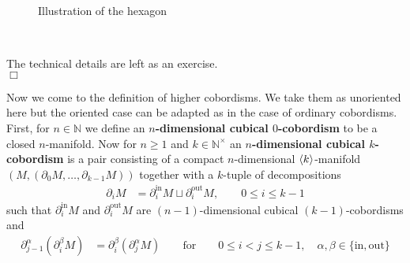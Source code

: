 \begin{exa}
\begin{enumerate}
\begin{figure}[h!]
\caption{Illustration of the hexagon}
\label{fig:hexagon}
\end{figure}
\\
\end{enumerate}
\end{exa}
\begin{prf}
The technical details are left as an exercise.
\\
\phantom{proven}
\hfill
$\Box$
\end{prf}
Now we come to the definition of higher cobordisms. We take them as unoriented here but the oriented case can be adapted as in the case of ordinary cobordisms. First, for $n \in \mathbb{N}$ we define an \textbf{$n$-dimensional cubical $0$-cobordism} to be a closed $n$-manifold. Now for $n \geq 1$ and $k \in \mathbb{N}^{\times}$ an \textbf{$n$-dimensional cubical $k$-cobordism} is a pair consisting of a compact $n$-dimensional $\Braket{k}$-manifold $(M,(\partial_{0}M,\ldots,\partial_{k-1}M))$ together with a $k$-tuple of decompositions
\begin{align*}
  \partial_{i}M
  &=
  \partial_{i}^{\mathrm{in}}M
  \sqcup
  \partial_{i}^{\mathrm{out}}M
  ,\qquad
  0
  \leq
  i
  \leq
  k-1
\end{align*}
such that $\partial_{i}^{\mathrm{in}}M$ and $\partial_{i}^{\mathrm{out}}M$ are $(n-1)$-dimensional cubical $(k-1)$-cobordisms and
\begin{align*}
  \partial_{j-1}^{\alpha}
  \left(
    \partial_{i}^{\beta}M
  \right)
  &=
  \partial_{i}^{\beta}
  \left(
    \partial_{j}^{\alpha}M
  \right)
  \qquad
  \text{for}
  \qquad
  0
  \leq
  i
  <
  j
  \leq
  k-1
  ,\quad
  \alpha
  ,
  \beta
  \in
  \lbrace
    \mathrm{in}
    ,
    \mathrm{out}
  \rbrace
\end{align*}
